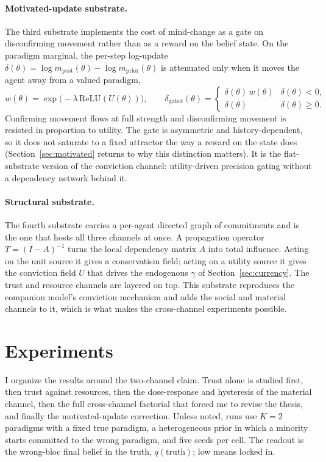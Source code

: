 \documentclass[11pt]{article}
\newcommand{\qtrue}{q(\text{truth})}
\begin{document}
\paragraph{Motivated-update substrate.} The third substrate implements the
cost of mind-change as a gate on disconfirming movement rather than as a reward
on the belief state. On the paradigm marginal, the per-step log-update
$\delta(\theta) = \log m_{\text{post}}(\theta) - \log m_{\text{prior}}(\theta)$
is attenuated only when it moves the agent away from a valued paradigm,
\[
w(\theta) = \exp\!\big(-\lambda\,\mathrm{ReLU}(U(\theta))\big), \qquad
\delta_{\text{gated}}(\theta) =
\begin{cases}
\delta(\theta)\,w(\theta) & \delta(\theta) < 0,\\
\delta(\theta) & \delta(\theta) \ge 0.
\end{cases}
\]
Confirming movement flows at full strength and disconfirming movement is
resisted in proportion to utility. The gate is asymmetric and history-dependent,
so it does not saturate to a fixed attractor the way a reward on the state does
(Section~\ref{sec:motivated} returns to why this distinction matters). It is the
flat-substrate version of the conviction channel: utility-driven precision
gating without a dependency network behind it.

\paragraph{Structural substrate.} The fourth substrate carries a per-agent
directed graph of commitments and is the one that hosts all three channels at
once. A propagation operator $T = (I-A)^{-1}$ turns the local dependency matrix
$A$ into total influence. Acting on the unit source it gives a conservatism
field; acting on a utility source it gives the conviction field $U$ that drives
the endogenous $\gamma$ of Section~\ref{sec:currency}. The trust and resource
channels are layered on top. This substrate reproduces the companion model's
conviction mechanism and adds the social and material channels to it, which is
what makes the cross-channel experiments possible.

\section{Experiments}
\label{sec:experiments}

I organize the results around the two-channel claim. Trust alone is studied
first, then trust against resources, then the dose-response and hysteresis of
the material channel, then the full cross-channel factorial that forced me to
revise the thesis, and finally the motivated-update correction. Unless noted,
runs use $K=2$ paradigms with a fixed true paradigm, a heterogeneous prior in
which a minority starts committed to the wrong paradigm, and five seeds per
cell. The readout is the wrong-bloc final belief in the truth, $\qtrue$; low
means locked in.
\end{document}
